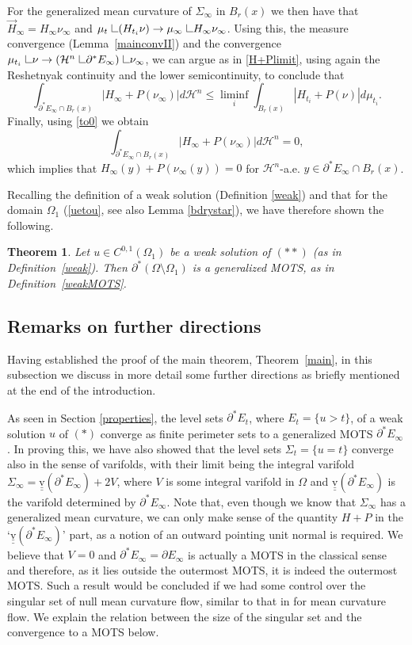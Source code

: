 \documentclass[11pt]{amsart}
\newtheorem{Theorem}{Theorem}
\def\H{\mathcal{H}}
\def\var{\underline{\underline{\text{v}}}}
\def\res{\hbox{ {\vrule height .25cm}{\leaders\hrule\hskip.2cm}}\hskip5.0\mu}
\begin{document}
For the generalized mean curvature of $\Sigma_\infty$ in $B_r(x)$ we then have that $\vec H_\infty=H_\infty\nu_\infty$ and $\mu_t\res(H_{t_i} \nu)\to \mu_\infty\res H_\infty\nu_\infty$. 
  Using this, the measure convergence (Lemma~\ref{mainconvII}) and the convergence $\mu_{t_i}\res \nu\to(\H^n\res\partial^* E_\infty)\res\nu_\infty$, we can argue as in \eqref{H+Plimit}, using again the Reshetnyak continuity and the lower semicontinuity, to conclude that
\[\int_{\partial^* E_\infty\cap B_r(x)}| H_\infty+ P(\nu_\infty)|d\H^n\le \liminf_i\int_{B_r(x)}|H_{t_i}+P(\nu)|d\mu_{t_i}.\]
Finally, using \eqref{to0} we obtain
\[\int_{\partial^* E_\infty\cap B_r(x)}| H_\infty+ P(\nu_\infty)|d\H^n=0,\]
which implies that $H_\infty(y)+P(\nu_\infty(y))=0$ for $\H^n$-a.e. $y\in \partial^* E_\infty\cap B_r(x)$.

Recalling the definition of a weak solution (Definition \ref{weak}) and that for the domain $\Omega_1$ (\eqref{uetou}, see also Lemma \ref{bdrystar}), we have therefore shown the following.


\begin{Theorem}\label{MOTSconv}
Let  $u\in C^{0,1}(\Omega_1)$ be a weak solution of $(**)$ (as  in Definition~\ref{weak}). Then $\partial^*(\Omega\setminus\Omega_1)$ is a generalized MOTS, as in Definition~\ref{weakMOTS}.
\end{Theorem}


\subsection{Remarks on further directions} 

Having established the proof of the main theorem, Theorem~\ref{main}, in this subsection we discuss in more detail some further directions as briefly mentioned at the end of the introduction.


As seen in Section \ref{properties}, the level sets $\partial^*E_t$, where $E_t=\{u>t\}$, of a weak solution $u$ of $(*)$ converge as finite perimeter sets to a generalized MOTS $\partial^*E_\infty$. In proving this, we have also showed  that the level sets $\Sigma_t=\{u=t\}$ converge also in the sense of varifolds, with their limit being the integral varifold $\Sigma_\infty=\var(\partial^* E_\infty)+ 2V$, where $V$ is some integral varifold in $\Omega$ and $\var(\partial^* E_\infty)$ is the varifold determined by $\partial^*E_\infty$. Note that, even though we know that $\Sigma_\infty$ has a generalized mean curvature, we can only make sense of the quantity $H+P$ in the `$\var(\partial^* E_\infty)$' part, as a notion of an outward pointing unit normal is required. We believe that $V=0$ and $\partial^*E_\infty=\partial E_\infty$ is actually a MOTS in the classical sense and therefore, as it lies outside the outermost MOTS, it is indeed the outermost MOTS. Such a result would be concluded if we  had some control over the singular set of null mean curvature flow, similar to that in  \cite{W00} for mean curvature flow. We explain the relation between the size of the singular set and the convergence to a MOTS below.
\end{document}
